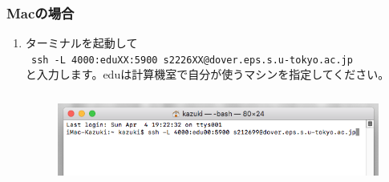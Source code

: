 \documentclass{jarticle}
\begin{document}
\subsubsection{Macの場合}
\begin{enumerate}
  \item ターミナルを起動して\\
    \verb| ssh -L 4000:eduXX:5900 s2226XX@dover.eps.s.u-tokyo.ac.jp |  \\
  と入力します。eduは計算機室で自分が使うマシンを指定してください。
  \begin{figure}[H]
    \centering
    \includegraphics[height=3cm,pagebox=cropbox,clip]{fig/VNCMac1.png}
  \end{figure}


\end{enumerate}
\end{document}
